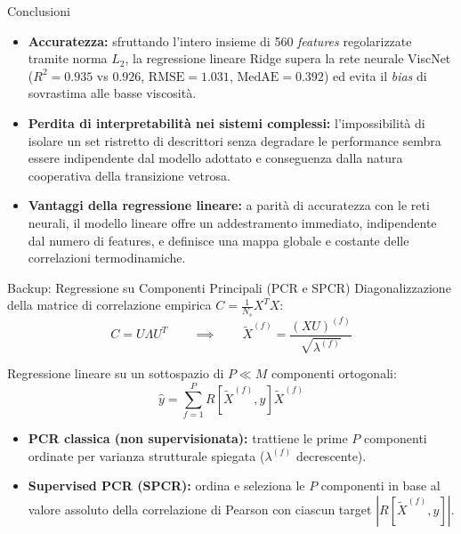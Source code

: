 \documentclass[10pt, aspectratio=169, table]{beamer}
\begin{document}
	\begin{frame}{Conclusioni}
		\small
		\begin{itemize}
			\item \textbf{Accuratezza:} sfruttando l'intero insieme di 560 \textit{features} regolarizzate tramite norma $L_2$, la regressione lineare Ridge supera la rete neurale ViscNet ($R^2 = 0.935$ vs $0.926$, $\text{RMSE} = 1.031$, $\text{MedAE} = 0.392$) ed evita il \textit{bias} di sovrastima alle basse viscosità.
			\vspace{0.35cm}
			
			\item \textbf{Perdita di interpretabilità nei sistemi complessi:} l'impossibilità di isolare un set ristretto di descrittori senza degradare le performance sembra essere indipendente dal modello adottato e conseguenza dalla natura cooperativa della transizione vetrosa.
			\vspace{0.35cm}
			
			\item \textbf{Vantaggi della regressione lineare:} a parità di accuratezza con le reti neurali, il modello lineare offre un addestramento immediato, indipendente dal numero di features, e definisce una mappa globale e costante delle correlazioni termodinamiche.
		\end{itemize}
	\end{frame}
	
	\appendix
	
	\begin{frame}{Backup: Regressione su Componenti Principali (PCR e SPCR)}
		\small
		Diagonalizzazione della matrice di correlazione empirica $C = \frac{1}{N_s}X^T X$:
		$$C = U \Lambda U^T \qquad \implies \qquad \tilde{X}^{(f)} = \frac{(X U)^{(f)}}{\sqrt{\lambda^{(f)}}}$$
		
		Regressione lineare su un sottospazio di $P \ll M$ componenti ortogonali:
		$$\hat{y} = \sum_{f=1}^{P} R[\tilde{X}^{(f)}, y] \tilde{X}^{(f)}$$
		
		\vspace{0.2cm}
		\begin{itemize}
			\item \textbf{PCR classica (non supervisionata):} trattiene le prime $P$ componenti ordinate per varianza strutturale spiegata ($\lambda^{(f)}$ decrescente).
			\vspace{0.2cm}
			\item \textbf{Supervised PCR (SPCR):} ordina e seleziona le $P$ componenti in base al valore assoluto della correlazione di Pearson con ciascun target $|R[\tilde{X}^{(f)}, y]|$.
		\end{itemize}
	\end{frame}
	
\end{document}
